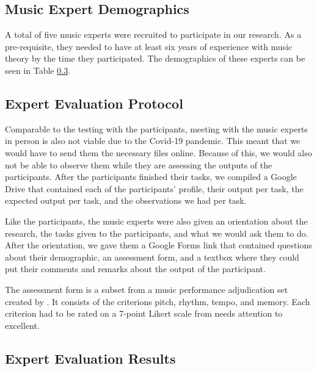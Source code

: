 \subsection{Music Expert Demographics}
A total of five music experts were recruited to participate in our research. As a pre-requisite, they needed to have at least six years of experience with music theory by the time they participated. The demographics of these experts can be seen in Table \ref{}.



\subsection{Expert Evaluation Protocol}
Comparable to the testing with the participants, meeting with the music experts in person is also not viable due to the Covid-19 pandemic. This meant that we would have to send them the necessary files online. Because of this, we would also not be able to observe them while they are assessing the outputs of the participants. After the participants finished their tasks, we compiled a Google Drive that contained each of the participants' profile, their output per task, the expected output per task, and the observations we had per task.

Like the participants, the music experts were also given an orientation about the research, the tasks given to the participants, and what we would ask them to do. After the orientation, we gave them a Google Forms link that contained questions about their demographic, an assessment form, and a textbox where they could put their comments and remarks about the output of the participant.

The assessment form is a subset from a music performance adjudication set created by . It consists of the criterions pitch, rhythm, tempo, and memory. Each criterion had to be rated on a 7-point Likert scale from needs attention to excellent. 

\subsection{Expert Evaluation Results}